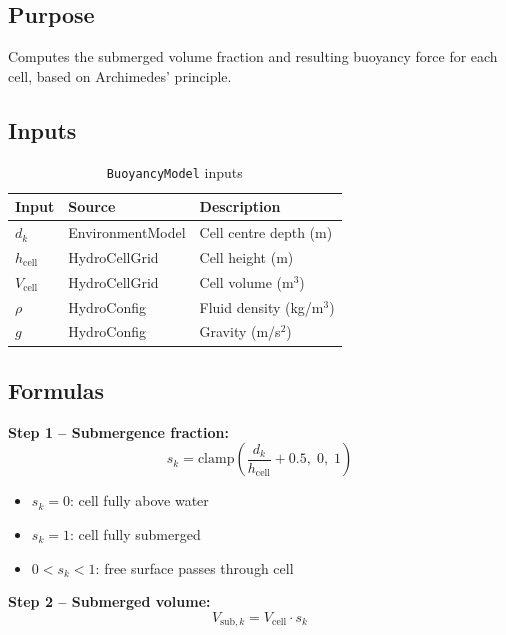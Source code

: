 \documentclass[12pt,a4paper]{article}
\begin{document}
\subsection{Purpose}

Computes the submerged volume fraction and resulting buoyancy force for
each cell, based on Archimedes' principle.

\subsection{Inputs}

\begin{table}[H]
  \centering
  \caption{\texttt{BuoyancyModel} inputs}
  \begin{tabularx}{\linewidth}{llX}
    \toprule
    \textbf{Input} & \textbf{Source} & \textbf{Description} \\
    \midrule
    $d_k$ & EnvironmentModel & Cell centre depth (m) \\
    $h_{\text{cell}}$ & HydroCellGrid & Cell height (m) \\
    $V_{\text{cell}}$ & HydroCellGrid & Cell volume (m$^3$) \\
    $\rho$ & HydroConfig & Fluid density (kg/m$^3$) \\
    $g$ & HydroConfig & Gravity (m/s$^2$) \\
    \bottomrule
  \end{tabularx}
\end{table}

\subsection{Formulas}

\textbf{Step 1 -- Submergence fraction:}
\begin{equation}
  \boxed{
  s_k = \mathrm{clamp}\!\left(\frac{d_k}{h_{\text{cell}}} + 0.5,\; 0,\; 1\right)
  }
  \label{eq:submergence}
\end{equation}

\begin{itemize}
  \item $s_k = 0$: cell fully above water
  \item $s_k = 1$: cell fully submerged
  \item $0 < s_k < 1$: free surface passes through cell
\end{itemize}

\textbf{Step 2 -- Submerged volume:}
\begin{equation}
  V_{\text{sub},k} = V_{\text{cell}} \cdot s_k
  \label{eq:sub_vol}
\end{equation}
\end{document}
